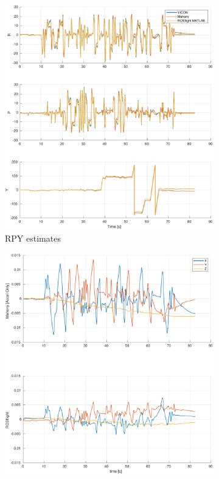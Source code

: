 \documentclass[a4paper]{article}
\begin{document}
\begin{figure}[H]
  \centering
  \begin{subfigure}[t]{0.31\textwidth}
    \includegraphics[width=\textwidth]{estrpy_accel_ext100.pdf}
    \caption{RPY estimates}
    \label{fig:scf_meas}
  \end{subfigure}\hfill
  \begin{subfigure}[t]{0.31\textwidth}
    \includegraphics[width=\textwidth]{estbias_accel_ext100.pdf}

\end{subfigure}
\end{figure}
\end{document}
